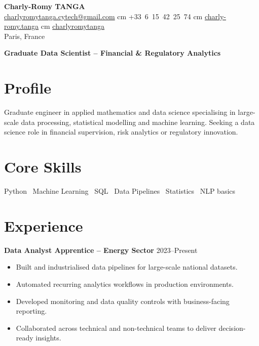 \documentclass[10pt, letterpaper]{article}
\begin{document}
\begin{center}
    \textbf{\LARGE Charly-Romy TANGA} \\[0.15cm]
    \mbox{\href{mailto:charlyromytanga.cytech@gmail.com}{\footnotesize\faEnvelope\hspace*{0.1cm}charlyromytanga.cytech@gmail.com}}
     cm
    \mbox{\faPhone\hspace*{0.1cm}+33 6 15 42 25 74}
     cm
    \mbox{\href{https://www.linkedin.com/in/charly-romy-tanga}{\footnotesize\faLinkedin\hspace*{0.1cm}charly-romy.tanga}}
     cm
    \mbox{\href{https://github.com/charlyromytanga}{\footnotesize\faGithub\hspace*{0.1cm}charlyromytanga}}
    \\[0.15cm]
    Paris, France
\end{center}

\textbf{Graduate Data Scientist -- Financial \& Regulatory Analytics}

\section*{Profile}
Graduate engineer in applied mathematics and data science specialising in large-scale data processing, statistical modelling and machine learning. Seeking a data science role in financial supervision, risk analytics or regulatory innovation.

\section*{Core Skills}
Python \textbullet\ Machine Learning \textbullet\ SQL \textbullet\ Data Pipelines \textbullet\ Statistics \textbullet\ NLP basics

\section*{Experience}
\textbf{Data Analyst Apprentice -- Energy Sector} \hfill 2023--Present
\begin{itemize}[leftmargin=0.45cm,itemsep=1pt,topsep=2pt]
\item Built and industrialised data pipelines for large-scale national datasets.
\item Automated recurring analytics workflows in production environments.
\item Developed monitoring and data quality controls with business-facing reporting.
\item Collaborated across technical and non-technical teams to deliver decision-ready insights.
\end{itemize}
\end{document}
